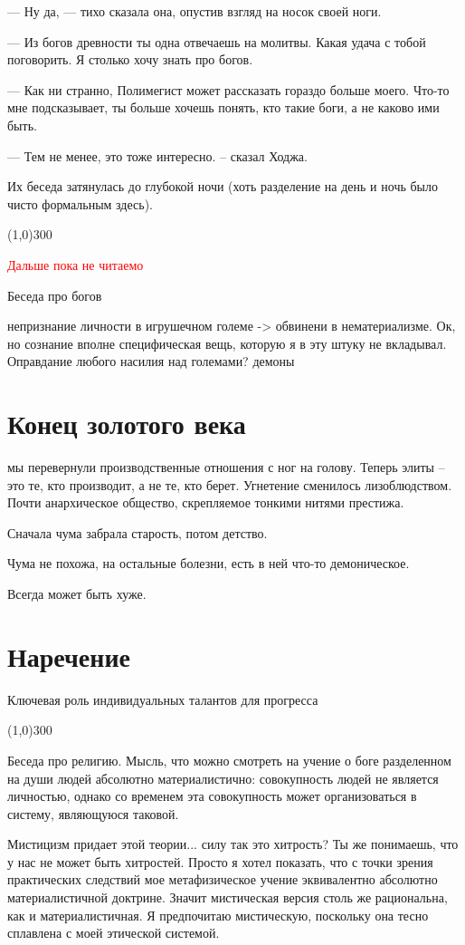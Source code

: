 \documentclass[12pt,a4paper]{article}
\newcommand{\tr}[1]{\textcolor{red}{#1}}
\newcommand{\todo}[1]{\marginpar{\scriptsize \tr{#1}}}
\newcommand{\sep}{
	\begin{center}
		\line(1,0){300}
	\end{center}
}
\begin{document}
--- Ну да, --- тихо сказала она, опустив взгляд на носок своей ноги.

--- \todo{Неестественное упихивание факта в диалог} Из богов древности ты одна отвечаешь на молитвы. Какая удача с тобой поговорить. Я столько хочу знать про богов.

--- Как ни странно, Полимегист может рассказать гораздо больше моего. Что-то мне подсказывает, ты больше хочешь понять, кто такие боги, а не каково ими быть.

--- Тем не менее, это тоже интересно. -- сказал Ходжа.

Их беседа затянулась до глубокой ночи (хоть разделение на день и ночь было чисто формальным здесь). \todo{Придумать нормальный конец беседы}

\sep


\tr{\Large \center Дальше пока не читаемо}
\newpage


Беседа про богов

непризнание личности в игрушечном големе -> обвинени в нематериализме.
Ок, но сознание вполне специфическая вещь, которую я в эту штуку не вкладывал.
Оправдание любого насилия над големами? демоны

\section*{Конец золотого века}

мы перевернули производственные отношения с ног на голову. Теперь элиты -- это те, кто производит, а не те, кто берет. Угнетение сменилось лизоблюдством. Почти анархическое общество, скрепляемое тонкими нитями престижа.


Сначала чума забрала старость, потом детство.

Чума не похожа, на остальные болезни, есть в ней что-то демоническое.

Всегда может быть хуже.

\section*{Наречение}
Ключевая роль индивидуальных талантов для прогресса

\sep

Беседа про религию. Мысль, что можно смотреть на учение о боге разделенном на души людей абсолютно материалистично: совокупность людей не является личностью, однако со временем эта совокупность может организоваться в систему, являющуюся таковой.

Мистицизм придает этой теории... силу
так это хитрость?
Ты же понимаешь, что у нас не может быть хитростей. Просто я хотел показать, что с точки зрения практических следствий мое метафизическое учение эквивалентно абсолютно материалистичной доктрине. Значит мистическая версия столь же рациональна, как и материалистичная. Я предпочитаю мистическую, поскольку она тесно сплавлена с моей этической системой.
\end{document}
